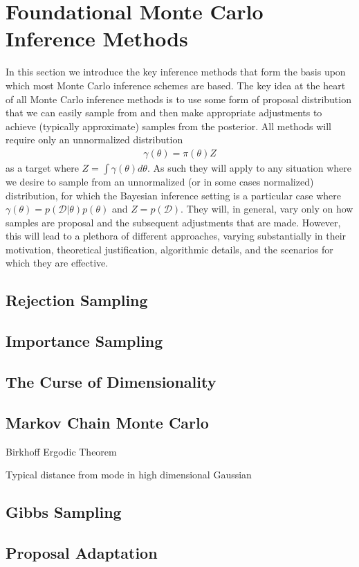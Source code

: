 
\section{Foundational Monte Carlo Inference Methods}
\label{sec:inf:foundation}

In this section we introduce the key inference methods that form
the basis upon which most Monte Carlo inference schemes are based.  The
key idea at the heart of all Monte Carlo inference methods is to use some form
of proposal distribution that we can easily sample from and then make
appropriate adjustments to achieve (typically approximate) samples from
the posterior.  All methods will require only an unnormalized distribution
\begin{align}
\label{eq:inf:unnorm-target}
\gamma(\theta) = \pi(\theta)Z
\end{align}
as a target where $Z = \int \gamma(\theta) d\theta$.  As such they will apply to
any situation where we desire to sample from an unnormalized 
(or in some cases normalized) distribution, for which
the Bayesian inference setting is a particular case where
$\gamma(\theta) = p(\mathcal{D}|\theta)p(\theta)$ and $Z = p(\mathcal{D})$.
They will, in general, vary only on how samples are proposal
and the subsequent adjustments that are made.  However, this will lead to a
plethora of different approaches, varying substantially in their motivation,
theoretical justification, algorithmic details, and the scenarios for which they
are effective.

\subsection{Rejection Sampling}
\label{sec:inf:foundation:rejection}



\subsection{Importance Sampling}
\label{sec:inf:foundation:importance}



\subsection{The Curse of Dimensionality}
\label{sec:inf:foundation:curse}



\subsection{Markov Chain Monte Carlo}
\label{sec:inf:foundation:mcmc}

Birkhoff Ergodic Theorem

Typical distance from mode in high dimensional Gaussian

\subsection{Gibbs Sampling}
\label{sec:inf:foundation:gibbs}

\subsection{Proposal Adaptation}
\label{sec:inf:proposal-adapt}